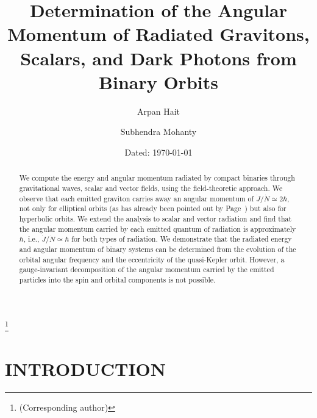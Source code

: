\documentclass[aps,prd]{revtex4-2}
\begin{document}
\setcounter{page}{1}
\title[]{Determination of the Angular Momentum  of Radiated Gravitons, Scalars, and Dark Photons from Binary Orbits}
\author{Arpan Hait}
\thanks{(Corresponding author)}
\author{Subhendra Mohanty}
\date[]{Dated: \today}

\begin{abstract}
 We compute the energy and angular momentum radiated by compact binaries through gravitational waves, scalar and vector fields, using the field-theoretic approach. We observe that each emitted graviton carries away an angular momentum of $\dot{J}/\dot {N}\simeq 2\hbar$, not only for elliptical orbits (as has already been pointed out by Page~\cite{Page:2025ncu}) but also for hyperbolic orbits.  We extend the analysis to scalar and vector radiation and find that the angular momentum carried by each emitted quantum of radiation is approximately $\hbar$, i.e., $\dot{J}/\dot{N}\simeq \hbar$ for both types of radiation. We demonstrate that the radiated energy and angular momentum of binary systems can be determined from the evolution of the orbital angular frequency and the eccentricity of the quasi-Kepler orbit. However, a gauge-invariant decomposition of the angular momentum carried by the emitted particles into the spin and orbital components is not possible. 
\end{abstract}


\maketitle


\section{INTRODUCTION}

\end{document}
